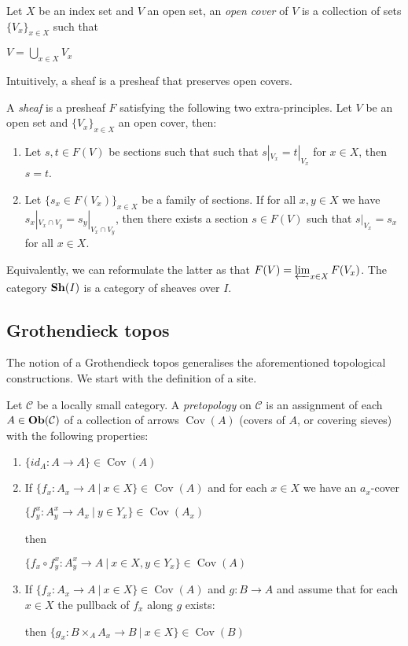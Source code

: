 \documentclass[a4paper]{article}
\theoremstyle{defin}
\theoremstyle{theorem}
\theoremstyle{claim}
\theoremstyle{prop}
\theoremstyle{lemma}
\theoremstyle{fact}
\theoremstyle{ex}
\theoremstyle{col}
\begin{document}
Let $X$ be an index set and $V$ an open set, an \emph{open cover} of $V$ is a collection of sets $\{ V_x\}_{x \in X}$ such that
\begin{center}
$V = \bigcup \limits_{x \in X} V_x$
\end{center}

Intuitively, a sheaf is a presheaf that preserves open covers.

A \emph{sheaf} is a presheaf $F$ satisfying the following two extra-principles. Let $V$ be an open set and $\{V_x
\}_{x \in X}$ an open cover, then:
\begin{enumerate}
\item Let $s, t \in F(V)$ be sections such that such that $s|_{V_x} = t|_{V_x}$ for $x \in X$, then $s = t$.
\item Let $\{ s_x \in F(V_x) \}_{x \in X}$ be a family of sections. If for all $x, y \in X$ we have $s_x|_{V_x \cap V_y} = s_y|_{V_x \cap V_y}$, then there exists a section $s \in F(V)$ such that $s|_{V_x} = s_x$ for all $x \in X$.
\end{enumerate}
Equivalently, we can reformulate the latter as that $F(V) = \varprojlim_{x \in X} F(V_x)$.
The category ${\bf Sh}(I)$ is a category of sheaves over $I$.

\subsection{Grothendieck topos}

The notion of a Grothendieck topos generalises the aforementioned topological constructions. We start with the definition of a site.

Let $\mathcal{C}$ be a locally small category. A \emph{pretopology} on $\mathcal{C}$ is an assignment of each $A \in {\bf Ob}(\mathcal{C})$ of a collection of arrows $\operatorname{Cov}(A)$ (covers of $A$, or covering sieves) with the following properties:
\begin{enumerate}
\item $\{ id_A : A \to A \} \in \operatorname{Cov}(A)$
\item If $\{ f_x : A_x \to A \: | \: x \in X \} \in \operatorname{Cov}(A)$ and for each $x \in X$ we have an $a_x$-cover
\begin{center}
$\{ f_y^x : A_y^x \to A_x \: | \: y \in Y_x \} \in \operatorname{Cov}(A_x)$
\end{center}
then
\begin{center}
$\{ f_x \circ f_y^x : A^x_y \to A \: | \: x \in X, y \in Y_x\} \in  \operatorname{Cov}(A)$
\end{center}
\item If $\{ f_x : A_x \to A \: | \: x \in X \} \in \operatorname{Cov}(A)$ and $g : B \to A$ and assume that for each $x \in X$ the pullback of $f_x$ along $g$ exists:

then $\{ g_x : B \times_A A_x \to B \:| \: x \in X\} \in \operatorname{Cov}(B)$
\end{enumerate}
\end{document}
